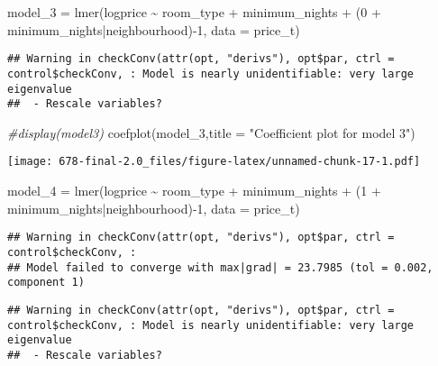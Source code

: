 \documentclass[
]{article}
\newenvironment{Shaded}{\begin{snugshade}}{\end{snugshade}}
\newcommand{\AttributeTok}[1]{\textcolor[rgb]{0.77,0.63,0.00}{#1}}
\newcommand{\CommentTok}[1]{\textcolor[rgb]{0.56,0.35,0.01}{\textit{#1}}}
\newcommand{\DecValTok}[1]{\textcolor[rgb]{0.00,0.00,0.81}{#1}}
\newcommand{\FunctionTok}[1]{\textcolor[rgb]{0.00,0.00,0.00}{#1}}
\newcommand{\NormalTok}[1]{#1}
\newcommand{\OtherTok}[1]{\textcolor[rgb]{0.56,0.35,0.01}{#1}}
\newcommand{\SpecialCharTok}[1]{\textcolor[rgb]{0.00,0.00,0.00}{#1}}
\newcommand{\StringTok}[1]{\textcolor[rgb]{0.31,0.60,0.02}{#1}}
\begin{document}
\begin{Shaded}
\begin{Highlighting}[]
\NormalTok{model\_3 }\OtherTok{=} \FunctionTok{lmer}\NormalTok{(logprice }\SpecialCharTok{\textasciitilde{}}\NormalTok{ room\_type }\SpecialCharTok{+}\NormalTok{ minimum\_nights }\SpecialCharTok{+}\NormalTok{ (}\DecValTok{0} \SpecialCharTok{+}\NormalTok{ minimum\_nights}\SpecialCharTok{|}\NormalTok{neighbourhood)}\SpecialCharTok{{-}}\DecValTok{1}\NormalTok{, }\AttributeTok{data =}\NormalTok{  price\_t)}
\end{Highlighting}
\end{Shaded}

\begin{verbatim}
## Warning in checkConv(attr(opt, "derivs"), opt$par, ctrl = control$checkConv, : Model is nearly unidentifiable: very large eigenvalue
##  - Rescale variables?
\end{verbatim}

\begin{Shaded}
\begin{Highlighting}[]
\CommentTok{\#display(model3)}
\FunctionTok{coefplot}\NormalTok{(model\_3,}\AttributeTok{title =} \StringTok{"Coefficient plot for model 3"}\NormalTok{)}
\end{Highlighting}
\end{Shaded}

\texttt{[image: 678-final-2.0\_files/figure-latex/unnamed-chunk-17-1.pdf]}

\begin{Shaded}
\begin{Highlighting}[]
\NormalTok{model\_4 }\OtherTok{=} \FunctionTok{lmer}\NormalTok{(logprice }\SpecialCharTok{\textasciitilde{}}\NormalTok{ room\_type }\SpecialCharTok{+}\NormalTok{ minimum\_nights }\SpecialCharTok{+}\NormalTok{ (}\DecValTok{1} \SpecialCharTok{+}\NormalTok{ minimum\_nights}\SpecialCharTok{|}\NormalTok{neighbourhood)}\SpecialCharTok{{-}}\DecValTok{1}\NormalTok{, }\AttributeTok{data =}\NormalTok{  price\_t)}
\end{Highlighting}
\end{Shaded}

\begin{verbatim}
## Warning in checkConv(attr(opt, "derivs"), opt$par, ctrl = control$checkConv, :
## Model failed to converge with max|grad| = 23.7985 (tol = 0.002, component 1)
\end{verbatim}

\begin{verbatim}
## Warning in checkConv(attr(opt, "derivs"), opt$par, ctrl = control$checkConv, : Model is nearly unidentifiable: very large eigenvalue
##  - Rescale variables?
\end{verbatim}
\end{document}

